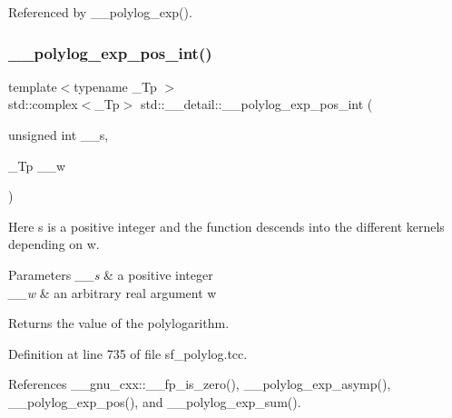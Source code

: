 Referenced by \+\_\+\+\_\+polylog\+\_\+exp().

\mbox{\label{namespacestd_1_1____detail_a6d05f9213f03b1781250cc048739e55b}} 
\subsubsection{\texorpdfstring{\+\_\+\+\_\+polylog\+\_\+exp\+\_\+pos\+\_\+int()}{\_\_polylog\_exp\_pos\_int()}\hspace{0.1cm}{\footnotesize\ttfamily [2/2]}}
{\footnotesize\ttfamily template$<$typename \+\_\+\+Tp $>$ \\
std\+::complex$<$\+\_\+\+Tp$>$ std\+::\+\_\+\+\_\+detail\+::\+\_\+\+\_\+polylog\+\_\+exp\+\_\+pos\+\_\+int (\begin{DoxyParamCaption}\item[{unsigned int}]{\+\_\+\+\_\+s,  }\item[{\+\_\+\+Tp}]{\+\_\+\+\_\+w }\end{DoxyParamCaption})}

Here s is a positive integer and the function descends into the different kernels depending on w.


\begin{DoxyParams}{Parameters}
{\em \+\_\+\+\_\+s} & a positive integer \\
\hline
{\em \+\_\+\+\_\+w} & an arbitrary real argument w \\
\hline
\end{DoxyParams}
\begin{DoxyReturn}{Returns}
the value of the polylogarithm. 
\end{DoxyReturn}


Definition at line 735 of file sf\+\_\+polylog.\+tcc.



References \+\_\+\+\_\+gnu\+\_\+cxx\+::\+\_\+\+\_\+fp\+\_\+is\+\_\+zero(), \+\_\+\+\_\+polylog\+\_\+exp\+\_\+asymp(), \+\_\+\+\_\+polylog\+\_\+exp\+\_\+pos(), and \+\_\+\+\_\+polylog\+\_\+exp\+\_\+sum().

\mbox{\label{namespacestd_1_1____detail_a36da38ab2aa8a67c089412937d5a695b}} 
